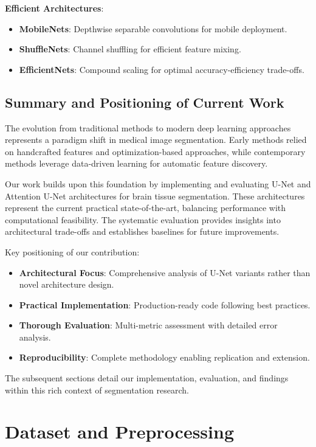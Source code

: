 \documentclass[12pt,a4paper]{article}
\begin{document}
\textbf{Efficient Architectures}:
\begin{itemize}
    \item \textbf{MobileNets}: Depthwise separable convolutions for mobile deployment.
    \item \textbf{ShuffleNets}: Channel shuffling for efficient feature mixing.
    \item \textbf{EfficientNets}: Compound scaling for optimal accuracy-efficiency trade-offs.
\end{itemize}

\subsection{Summary and Positioning of Current Work}

The evolution from traditional methods to modern deep learning approaches represents a paradigm shift in medical image segmentation. Early methods relied on handcrafted features and optimization-based approaches, while contemporary methods leverage data-driven learning for automatic feature discovery.

Our work builds upon this foundation by implementing and evaluating U-Net and Attention U-Net architectures for brain tissue segmentation. These architectures represent the current practical state-of-the-art, balancing performance with computational feasibility. The systematic evaluation provides insights into architectural trade-offs and establishes baselines for future improvements.

Key positioning of our contribution:
\begin{itemize}
    \item \textbf{Architectural Focus}: Comprehensive analysis of U-Net variants rather than novel architecture design.
    \item \textbf{Practical Implementation}: Production-ready code following best practices.
    \item \textbf{Thorough Evaluation}: Multi-metric assessment with detailed error analysis.
    \item \textbf{Reproducibility}: Complete methodology enabling replication and extension.
\end{itemize}

The subsequent sections detail our implementation, evaluation, and findings within this rich context of segmentation research.

\section{Dataset and Preprocessing}
\end{document}
